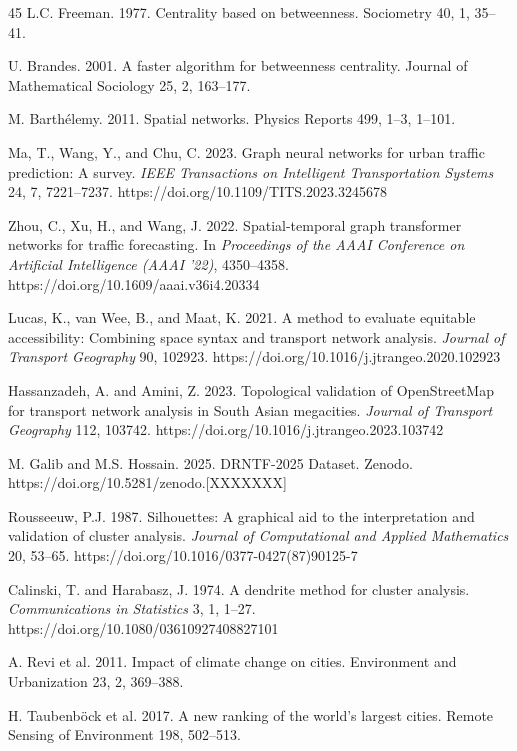 \documentclass[sigconf, nonacm]{acmart}
\begin{document}
\begin{thebibliography}{45}
 L.C. Freeman. 1977. Centrality based on betweenness. Sociometry 40, 1, 35--41.

 U. Brandes. 2001. A faster algorithm for betweenness centrality. Journal of Mathematical Sociology 25, 2, 163--177.

 M. Barthélemy. 2011. Spatial networks. Physics Reports 499, 1--3, 1--101.

 Ma, T., Wang, Y., and Chu, C. 2023. Graph neural networks for urban traffic prediction: A survey. \textit{IEEE Transactions on Intelligent Transportation Systems} 24, 7, 7221--7237. https://doi.org/10.1109/TITS.2023.3245678

 Zhou, C., Xu, H., and Wang, J. 2022. Spatial-temporal graph transformer networks for traffic forecasting. In \textit{Proceedings of the AAAI Conference on Artificial Intelligence (AAAI '22)}, 4350--4358. https://doi.org/10.1609/aaai.v36i4.20334

 Lucas, K., van Wee, B., and Maat, K. 2021. A method to evaluate equitable accessibility: Combining space syntax and transport network analysis. \textit{Journal of Transport Geography} 90, 102923. https://doi.org/10.1016/j.jtrangeo.2020.102923

 Hassanzadeh, A. and Amini, Z. 2023. Topological validation of OpenStreetMap for transport network analysis in South Asian megacities. \textit{Journal of Transport Geography} 112, 103742. https://doi.org/10.1016/j.jtrangeo.2023.103742

 M. Galib and M.S. Hossain. 2025. DRNTF-2025 Dataset. Zenodo. https://doi.org/10.5281/zenodo.[XXXXXXX]

 Rousseeuw, P.J. 1987. Silhouettes: A graphical aid to the interpretation and validation of cluster analysis. \textit{Journal of Computational and Applied Mathematics} 20, 53--65. https://doi.org/10.1016/0377-0427(87)90125-7

 Calinski, T. and Harabasz, J. 1974. A dendrite method for cluster analysis. \textit{Communications in Statistics} 3, 1, 1--27. https://doi.org/10.1080/03610927408827101

 A. Revi et al. 2011. Impact of climate change on cities. Environment and Urbanization 23, 2, 369--388.

 H. Taubenböck et al. 2017. A new ranking of the world's largest cities. Remote Sensing of Environment 198, 502--513.





\end{thebibliography}
\end{document}
